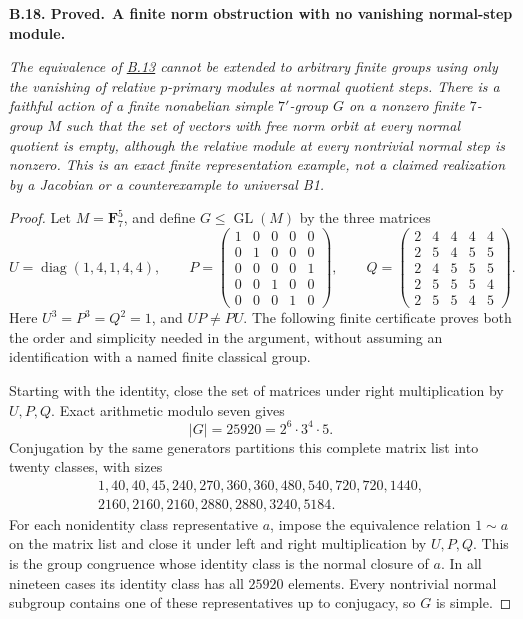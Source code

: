 \documentclass[11pt,a4paper]{article}
\newenvironment{claim}[3]{\par\medskip\noindent\hypertarget{#1}{\textbf{#1. #2.}}\ \textbf{#3.}\par\nopagebreak\smallskip\begingroup\itshape}{\endgroup\par\smallskip}
\newcommand{\statementref}[1]{\hyperlink{#1}{#1}}
\begin{document}
\begin{claim}{B.18}{Proved}{A finite norm obstruction with no vanishing normal-step module}
The equivalence of \statementref{B.13} cannot be extended to
arbitrary finite groups using only the vanishing of relative
$p$-primary modules at normal quotient steps. There is a
faithful action of a finite nonabelian simple $7'$-group $G$
on a nonzero finite $7$-group $M$ such that the set of vectors
with free norm orbit at every normal quotient is empty,
although the relative module at every nontrivial normal step
is nonzero. This is an exact finite representation example,
not a claimed realization by a Jacobian or a counterexample
to universal B1.
\end{claim}
\begin{proof}
Let $M=\mathbf F_7^5$, and define $G\le\operatorname{GL}(M)$
by the three matrices
\[
 U=\operatorname{diag}(1,4,1,4,4),\qquad
 P=\begin{pmatrix}
 1&0&0&0&0\\
 0&1&0&0&0\\
 0&0&0&0&1\\
 0&0&1&0&0\\
 0&0&0&1&0
 \end{pmatrix},\qquad
 Q=\begin{pmatrix}
 2&4&4&4&4\\
 2&5&4&5&5\\
 2&4&5&5&5\\
 2&5&5&5&4\\
 2&5&5&4&5
 \end{pmatrix}.                                                \tag{B.NA.1}
\]
Here $U^3=P^3=Q^2=1$, and $UP\ne PU$.
The following finite certificate proves both the order and
simplicity needed in the argument, without assuming an
identification with a named finite classical group.

Starting with the identity, close the set of matrices under
right multiplication by $U,P,Q$. Exact arithmetic modulo
seven gives
\[
                        |G|=25920=2^6\cdot3^4\cdot5.
\]
Conjugation by the same generators partitions this complete
matrix list into twenty classes, with sizes
\[
\begin{gathered}
 1,40,40,45,240,270,360,360,480,540,720,720,1440,\\
                   2160,2160,2160,2880,2880,3240,5184.
\end{gathered}                                                   \tag{B.NA.2}
\]
For each nonidentity class representative $a$, impose the
equivalence relation $1\sim a$ on the matrix list and close
it under left and right multiplication by $U,P,Q$. This is
the group congruence whose identity class is the normal
closure of $a$. In all nineteen cases its identity class
has all $25920$ elements. Every nontrivial normal subgroup
contains one of these representatives up to conjugacy, so
$G$ is simple.


\end{proof}
\end{document}
